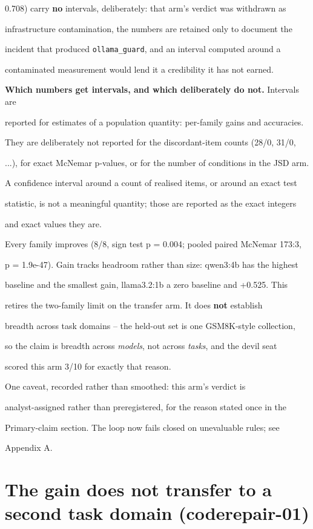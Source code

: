 \documentclass[11pt]{article}
\begin{document}
0.708) carry {\bf no} intervals, deliberately: that arm's verdict was withdrawn as

infrastructure contamination, the numbers are retained only to document the

incident that produced \texttt{ollama\_guard}, and an interval computed around a

contaminated measurement would lend it a credibility it has not earned.


{\bf Which numbers get intervals, and which deliberately do not.} Intervals are

reported for estimates of a population quantity: per-family gains and accuracies.

They are deliberately not reported for the discordant-item counts (28/0, 31/0,

...), for exact McNemar p-values, or for the number of conditions in the JSD arm.

A confidence interval around a count of realised items, or around an exact test

statistic, is not a meaningful quantity; those are reported as the exact integers

and exact values they are.


Every family improves (8/8, sign test p = 0.004; pooled paired McNemar 173:3,

p = 1.9e-47). Gain tracks headroom rather than size: qwen3:4b has the highest

baseline and the smallest gain, llama3.2:1b a zero baseline and +0.525. This

retires the two-family limit on the transfer arm. It does {\bf not} establish

breadth across task domains -- the held-out set is one GSM8K-style collection,

so the claim is breadth across {\it models}, not across {\it tasks}, and the devil seat

scored this arm 3/10 for exactly that reason.


One caveat, recorded rather than smoothed: this arm's verdict is

analyst-assigned rather than preregistered, for the reason stated once in the

Primary-claim section. The loop now fails closed on unevaluable rules; see

Appendix A.


\section*{The gain does not transfer to a second task domain (coderepair-01)}
\end{document}
